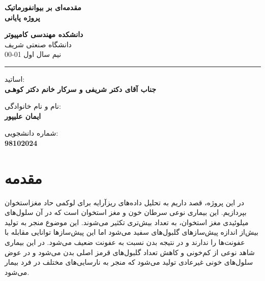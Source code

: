 \documentclass[12pt]{article}
\begin{document}
\begin{titlepage}
\begin{center}
        
\vspace*{0.7cm}

\vspace{0.5cm}
\textbf{ \Huge{\emph ‌مقدمه‌ای بر بیوانفورماتیک} }\\
\vspace{0.5cm}
\textbf{ \Large{ پروژه پایانی} }
\vspace{0.2cm}
       
 
      \large \textbf{دانشکده مهندسی کامپیوتر}\\\vspace{0.2cm}
    \large   دانشگاه صنعتی شریف\\\vspace{0.2cm}
       \large   ﻧﯿﻢ سال اول 01-00 \\\vspace{0.2cm}
      \noindent\rule[1ex]{\linewidth}{1pt}
اساتید:\\
 \vspace{0.30cm}
    \textbf{{جناب آقای دکتر شریفی و سرکار خانم دکتر کوﮬـی}}


    \vspace{0.40cm}
نام و نام خانوادگی:\\

        \vspace{0.30cm}
    \textbf{{
ایمان علیپور
    }}
    
        \vspace{0.40cm}
شماره دانشجویی:\\

        \vspace{0.30cm}
    \textbf{{
98102024
    }}
\end{center}
\end{titlepage}


\newpage
\pagestyle{fancy}
\fancyhf{}
\fancyfoot{}
\cfoot{\thepage}

\KashidaOff


\section{مقدمه}

در این پروژه، قصد داریم به تحلیل داده‌های ریزآرایه
 برای لوکمی حاد مغزاستخوان
بپردازیم. این بیماری نوعی سرطان خون و مغز استخوان است که در آن سلول‌های میلوئیدی
 مغز استخوان، به تعداد بیش‌تری تکثیر می‌شوند. این موضوع منجر به تولید بیش‌از اندازه پیش‌سازهای گلبول‌های سفید 
 می‌شود اما این پیش‌سازها توانایی مقابله با عفونت‌ها را ندارند و در نتیجه بدن نسبت به عفونت ضعیف می‌شود. در این بیماری شاهد نوعی از کم‌خونی و کاهش تعداد گلبول‌های قرمز اصلی بدن می‌شود و در عوض سلول‌های خونی غیرعادی تولید می‌شود که منجر به نارسایی‌های مختلف در فرد بیمار می‌شود.
 
\end{document}
